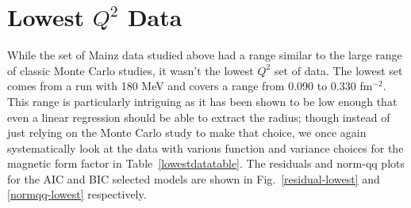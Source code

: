 \documentclass[10pt,aps,prc,twocolumn]{revtex4-1}
\begin{document}
\section{Lowest $Q^2$ Data} 

While the set of Mainz data studied above had a range similar to the large range of classic Monte Carlo studies, it wasn't
the lowest $Q^2$ set of data.   The lowest set comes from a run with 180 MeV 
and covers a range from 0.090 to 0.330 fm$^{-2}$.   This range is particularly intriguing as it has been shown to be
low enough that even a linear regression should be able to extract the radius; though instead of just relying on the Monte
Carlo study to make that choice, we once again systematically look at the data with various function and variance choices
for the magnetic form factor in Table~\ref{lowestdatatable}.   The residuals and norm-qq plots for the AIC and BIC selected
models are shown in Fig.~\ref{residual-lowest} and \ref{normqq-lowest} respectively.
\end{document}
